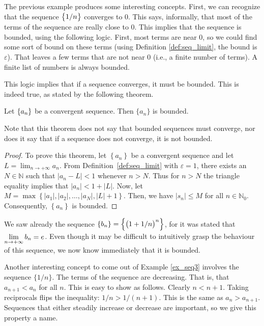 The previous example produces some interesting concepts. First, we can recognize that the sequence $\displaystyle\left\{1/n\right\}$ converges to 0. This says, informally, that most of the terms of the sequence are really close to 0. This implies that the sequence is bounded, using the following logic. First, most terms are near 0, so we could find some sort of bound on these terms (using Definition \ref{def:seq_limit}, the bound is $\varepsilon$). That leaves a few terms that are not near 0 (i.e., a finite number of terms). A finite list of numbers is always bounded. 

This logic implies that if a sequence converges, it must be bounded. This is indeed true, as stated by the following theorem.

\begin{theorem}\label{thm:converge_bounded}
Let $\displaystyle \left\{a_n\right\}$ be a convergent sequence. Then $\{a_n\}$ is bounded.
\end{theorem}

Note that this theorem does not say that bounded sequences must converge, nor does it say that if a sequence does not converge, it is not bounded.

\ifanalysis

\begin{proof}
To prove this theorem, let $\left\{a_n\right\}$ be a convergent sequence and let $L=\lim_{n\to+\infty}a_n$. From Definition~\ref{def:seq_limit} with $\varepsilon=1$, there exists an $N\in\mathbb{N}$ such that $\left|a_n-L\right|<1$ whenever $n>N$. Thus for $n>N$ the triangle equality implies that $\left|a_n\right|<1+\left|L\right|$. Now, let $M=\max\left\{\left|a_1\right|,\left|a_2\right|,\ldots,\left|a_N\right|,\left|L\right|+1\right\}$. Then, we have $\left|s_n\right|\leq M$ for all $n\in\mathbb{N}_0$. Consequently, $\left\{a_n\right\}$ is bounded. 
\end{proof}

\fi

We saw already  the sequence $\displaystyle \{b_n\} = \left\{\left(1+1/n\right)^{n}\right\}$, for it was stated that $\displaystyle \lim_{n\to+\infty} b_n = e$. Even though it may be difficult to intuitively grasp the behaviour of this sequence, we now know immediately that it is bounded.

Another interesting concept to come out of Example \ref{ex_seq3} involves the sequence $\{1/n\}$. The terms of the sequence are decreasing. That is, that $a_{n+1} < a_n$ for all $n$. This is easy to show as follows. Clearly $n < n+1$. Taking reciprocals flips the inequality: $1/n > 1/(n+1)$. This is the same as $a_n > a_{n+1}$. Sequences that either steadily increase or decrease are important, so we give this property a name.

